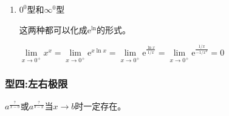 \begin{enumerate}
            
    

                        
        \begin{example}
            求极限：$\lim\limits_{x \to +\infty}(2x+1)^2 \sin{\frac{1}{x^2}}$。
        \end{example}  
        
        \begin{solution}
            \begin{align*}
                \text{原式}
                &=\lim_{x \to +\infty}\frac{(2x+1)^2}{x^2} \times \frac{\sin{\frac{1}{x^2}}}{\frac{1}{x^2}}=4
            \end{align*}
        \end{solution}

        \begin{example}
            求极限：$\lim\limits_{x \to +\infty}(x-x^2\ln(1+\displaystyle\frac{1}{x}))$。
        \end{example}

        \begin{solution}
            \begin{align*}
                \text{原式}
                &=\lim_{x \to +\infty}x^2(\frac{1}{x}-\ln(1+\frac{1}{x}))\\
                &=\lim_{x \to +\infty}\frac{\frac{1}{x}-\ln(1+\frac{1}{x})}{\frac{1}{x^2}}\\
                &\xlongequal{t=\frac{1}{x}}\lim_{t \to 0}\frac{t-\ln(1+t)}{t^2}\\
                &=\lim_{t \to 0}\frac{1-\frac{1}{t+1}}{2t}\\
                &=\lim_{t \to 0}\frac{\frac{t}{t+1}}{2t}=\frac{1}{2}
            \end{align*}
        \end{solution}

        \item $0^0$型和$\infty ^{0}$型

        这两种都可以化成$\mathrm{e}^{\ln}$的形式。

        \begin{example}
            $\lim\limits_{x \to 0^{+}}x^x=\lim\limits_{x \to 0^{+}}\mathrm{e}^{x \ln x}=\lim\limits_{x \to 0^{+}}\mathrm{e}^{\frac{\ln x}{1/x}}=\lim\limits_{x \to 0^{+}}\mathrm{e}^{\frac{1/x}{-1/x^2}}=0$
        \end{example}
        \end{enumerate}

        \subsubsection*{型四:左右极限}
        \FiveStar $a^{\displaystyle\frac{?}{x-b}}$或$a^{\displaystyle\frac{?}{b-x}}$当$x \to b$时一定存在。

   